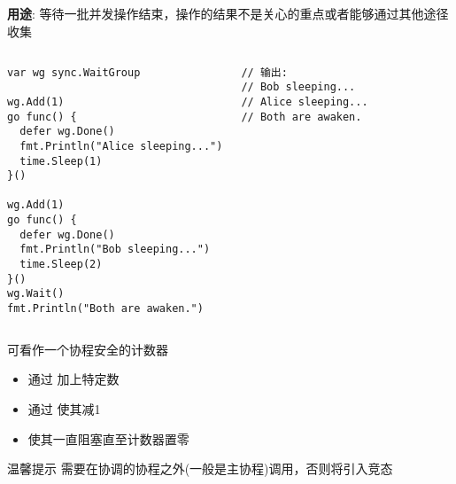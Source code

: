 \subsection{\WaitGroup}
\begin{frame}[fragile]{\WaitGroup}
   \textbf{用途}: 等待一批并发操作结束，\alert{操作的结果不是关心的重点或者能够通过其他途径收集} 

   \begin{columns}[t]
\begin{lstlisting}[xleftmargin=8pt]
var wg sync.WaitGroup

wg.Add(1)
go func() {
  defer wg.Done()
  fmt.Println("Alice sleeping...")
  time.Sleep(1)
}()

wg.Add(1)
go func() {
  defer wg.Done()
  fmt.Println("Bob sleeping...")
  time.Sleep(2)
}()
wg.Wait()
fmt.Println("Both are awaken.")
\end{lstlisting}

\begin{lstlisting}[firstnumber=last,xleftmargin=16pt]
// 输出:
// Bob sleeping...
// Alice sleeping...
// Both are awaken.
\end{lstlisting}
   \end{columns}
\end{frame}

\begin{frame}{\WaitGroup}
    \WaitGroup 可看作一个\alert{协程安全}的计数器

    \begin{itemize}
        \item 通过 加上特定数
        \item 通过 使其减1
        \item {}使其一直阻塞直至计数器置零
    \end{itemize}

    \pause
    \begin{alertblock}{温馨提示}
        需要在\WaitGroup 协调的协程之外(一般是主协程)调用，否则将引入\alert{竞态}
    \end{alertblock}
\end{frame}
